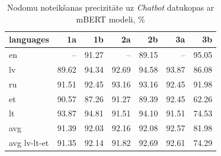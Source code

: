 \begin{table}[htbp]
  \centering
  \caption{Nodomu noteikšanas precizitāte uz \textit{Chatbot} datukopas ar mBERT modeli, \%}
    \begin{tabular}{lrrrrrr} \toprule
    languages & 1a & 1b & 2a & 2b & 3a & 3b \\\midrule
    en    &   --    & \cellcolor[rgb]{ .984,  .973,  .984}91.27 &   --    & \cellcolor[rgb]{ .984,  .929,  .941}89.15 &   --    & \cellcolor[rgb]{ .353,  .541,  .776}95.05 \\
    lv    & \cellcolor[rgb]{ .984,  .941,  .953}89.62 & \cellcolor[rgb]{ .502,  .647,  .831}94.34 & \cellcolor[rgb]{ .851,  .894,  .953}92.69 & \cellcolor[rgb]{ .455,  .612,  .812}94.58 & \cellcolor[rgb]{ .604,  .718,  .867}93.87 & \cellcolor[rgb]{ .984,  .871,  .882}86.08 \\
    ru    & \cellcolor[rgb]{ .984,  .976,  .988}91.51 & \cellcolor[rgb]{ .902,  .925,  .969}92.45 & \cellcolor[rgb]{ .753,  .824,  .918}93.16 & \cellcolor[rgb]{ .753,  .824,  .918}93.16 & \cellcolor[rgb]{ .902,  .925,  .969}92.45 & \cellcolor[rgb]{ .984,  .984,  .996}91.98 \\
    et    & \cellcolor[rgb]{ .984,  .957,  .969}90.57 & \cellcolor[rgb]{ .984,  .894,  .906}87.26 & \cellcolor[rgb]{ .984,  .973,  .984}91.27 & \cellcolor[rgb]{ .984,  .933,  .945}89.39 & \cellcolor[rgb]{ .902,  .925,  .969}92.45 & \cellcolor[rgb]{ .973,  .412,  .42}62.26 \\
    lt    & \cellcolor[rgb]{ .604,  .718,  .867}93.87 & \cellcolor[rgb]{ .404,  .576,  .796}94.81 & \cellcolor[rgb]{ .984,  .976,  .988}91.51 & \cellcolor[rgb]{ .553,  .682,  .847}94.10 & \cellcolor[rgb]{ .984,  .976,  .988}91.51 & \cellcolor[rgb]{ .976,  .647,  .655}74.53 \\\midrule
    avg   & \cellcolor[rgb]{ .984,  .973,  .984}91.39 & \cellcolor[rgb]{ .988,  .988,  1}92.03 & \cellcolor[rgb]{ .965,  .973,  .992}92.16 & \cellcolor[rgb]{ .98,  .984,  1}92.08 & \cellcolor[rgb]{ .875,  .91,  .961}92.57 & \cellcolor[rgb]{ .98,  .792,  .804}81.98 \\
    avg lv-lt-et & \cellcolor[rgb]{ .984,  .973,  .984}91.35 & \cellcolor[rgb]{ .969,  .973,  .992}92.14 & \cellcolor[rgb]{ .984,  .98,  .992}91.82 & \cellcolor[rgb]{ .851,  .894,  .953}92.69 & \cellcolor[rgb]{ .867,  .906,  .961}92.61 & \cellcolor[rgb]{ .976,  .643,  .651}74.29 \\\bottomrule
    \end{tabular}%
  \label{tab:chatbot-bert}%
\end{table}%


